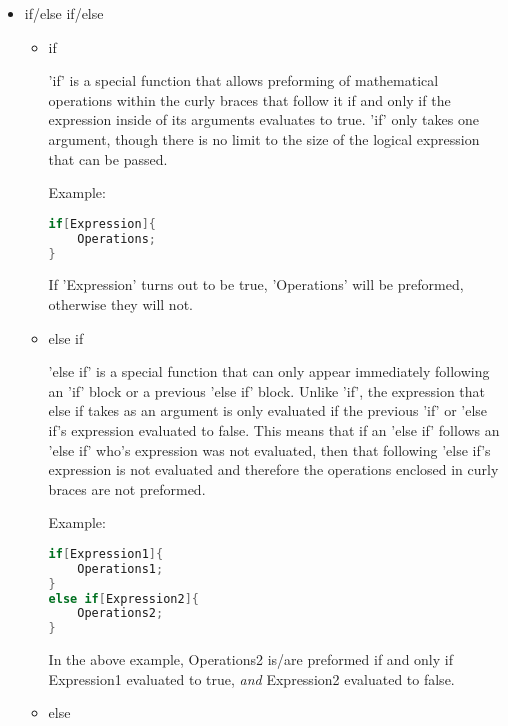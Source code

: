 \begin{itemize}
\item if/else if/else \\
\begin{itemize}
\item if\\
\begin{center}
'if' is a special function that allows preforming of mathematical operations within the curly braces that follow it if and only if the expression inside of its arguments evaluates to true. 'if' only takes one argument, though there is no limit to the size of the logical expression that can be passed. \\
\end{center}
Example:\\
\begin{lstlisting}[mathescape,language=C,caption=if Example,label=lst:ifex]
if[Expression]{
	Operations;
}
\end{lstlisting}
\begin{center}
If 'Expression' turns out to be true, 'Operations' will be preformed, otherwise they will not.
\end{center}
\item else if\\
\begin{center}
'else if' is a special function that can only appear immediately following an 'if' block or a previous 'else if' block. Unlike 'if', the expression that else if takes as an argument is only evaluated if the previous 'if' or 'else if's expression evaluated to false. This means that if an 'else if' follows an 'else if' who's expression was not evaluated, then that following 'else if's expression is not evaluated and therefore the operations enclosed in curly braces are not preformed.
\end{center}
Example:\\
\begin{lstlisting}[language=C,caption=else if Example,label=lst:elifex,mathescape]
if[Expression1]{
	Operations1;
}
else if[Expression2]{
	Operations2;
}
\end{lstlisting}
\begin{center}
In the above example, Operations2 is/are preformed if and only if Expression1 evaluated to true, \emph{and} Expression2 evaluated to false.
\end{center}
\item else\\
\begin{center}

\end{center}
\end{itemize}
\end{itemize}
